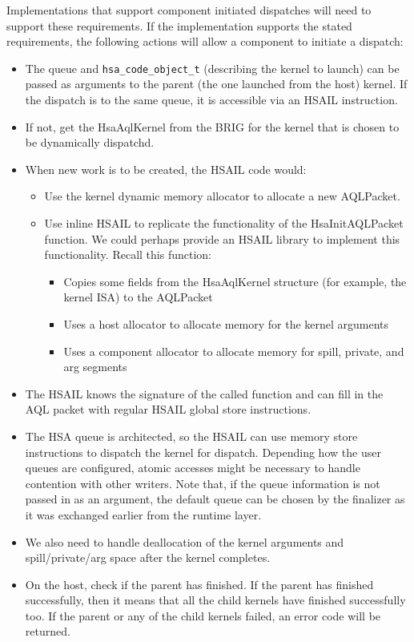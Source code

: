 Implementations that support component initiated dispatches will
need to support these requirements. If the implementation supports
the stated requirements, the following actions will allow a
component to initiate a dispatch\-:
\begin{itemize}
\item The queue and \texttt{hsa\_code\_object\_t} (describing the
kernel to launch) can be passed as arguments to the parent (the one
launched from the host) kernel. If the dispatch is to the same
queue, it is accessible via an HSAIL instruction.
\item If not, get the Hsa\-Aql\-Kernel from the B\-R\-I\-G for the
kernel that is chosen to be dynamically dispatchd.
\item When new work is to be created, the H\-S\-A\-I\-L code would\-:
\begin{itemize}
\item Use the kernel dynamic memory allocator to allocate a new
A\-Q\-L\-Packet.
\item Use inline H\-S\-A\-I\-L to replicate the functionality of the
Hsa\-Init\-A\-Q\-L\-Packet function. We could perhaps provide an
H\-S\-A\-I\-L library to implement this functionality. Recall this
function\-:
\begin{itemize}
\item Copies some fields from the Hsa\-Aql\-Kernel structure (for
example, the kernel I\-S\-A) to the A\-Q\-L\-Packet
\item Uses a host allocator to allocate memory for the kernel
arguments
\item Uses a component allocator to allocate memory for spill,
private, and arg segments
\end{itemize}
\end{itemize}
\item The H\-S\-A\-I\-L knows the signature of the called function
and can fill in the A\-Q\-L packet with regular H\-S\-A\-I\-L global
store instructions.
\item The H\-S\-A queue is architected, so the H\-S\-A\-I\-L can use
memory store instructions to dispatch the kernel for dispatch.
Depending how the user queues are configured, atomic accesses might
be necessary to handle contention with other writers. Note that, if
the queue information is not passed in as an argument, the default
queue can be chosen by the finalizer as it was exchanged earlier
from the runtime layer.
\item We also need to handle deallocation of the kernel arguments
and spill/private/arg space after the kernel completes.
\item On the host, check if the parent has finished. If the parent
has finished successfully, then it means that all the child kernels
have finished successfully too. If the parent or any of the child
kernels failed, an error code will be returned. 
\end{itemize}
